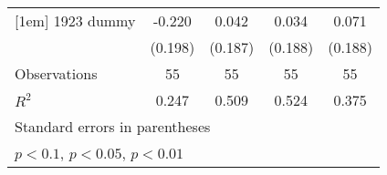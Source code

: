 {\begin{tabular}{l*{4}{c}}
[1em]
1923 dummy          &      -0.220         &       0.042         &       0.034         &       0.071         \\
                    &     (0.198)         &     (0.187)         &     (0.188)         &     (0.188)         \\
\hline
Observations        &          55         &          55         &          55         &          55         \\
\(R^{2}\)           &       0.247         &       0.509         &       0.524         &       0.375         \\
\hline\hline
\multicolumn{5}{l}{\footnotesize Standard errors in parentheses}\\
\multicolumn{5}{l}{\footnotesize \sym{*} \(p<0.1\), \sym{**} \(p<0.05\), \sym{***} \(p<0.01\)}\\
\end{tabular}
}
